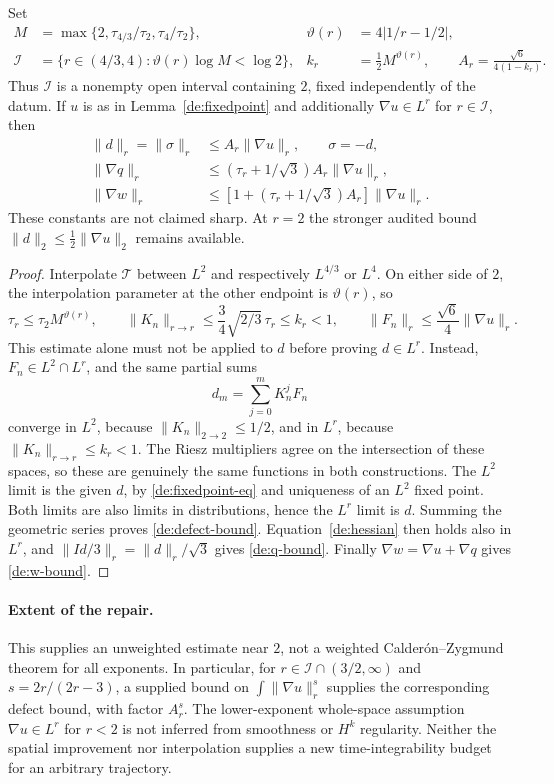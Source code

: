 \begin{theorem}
\label{de:near2}
Set
\begin{align*}
 M&=\max\{2,\tau_{4/3}/\tau_2,\tau_4/\tau_2\},&
 \vartheta(r)&=4|1/r-1/2|,\\
 \mathcal I&=\{r\in(4/3,4):\vartheta(r)\log M<\log2\},&
 k_r&=\tfrac12M^{\vartheta(r)},\qquad
 A_r=\frac{\sqrt6}{4(1-k_r)}.
\end{align*}
Thus $\mathcal I$ is a nonempty open interval containing $2$, fixed
independently of the datum.  If $u$ is as in Lemma~\ref{de:fixedpoint}
and additionally $\nabla u\in L^r$ for $r\in\mathcal I$, then
\begin{align}
 \|d\|_r=\|\sigma\|_r&\le A_r\|\nabla u\|_r,
       \qquad \sigma=-d,\label{de:defect-bound}\\
 \|\nabla q\|_r&\le(\tau_r+1/\sqrt3)A_r\|\nabla u\|_r,\label{de:q-bound}\\
 \|\nabla w\|_r&\le[1+(\tau_r+1/\sqrt3)A_r]\|\nabla u\|_r.
       \label{de:w-bound}
\end{align}
These constants are not claimed sharp.  At $r=2$ the stronger audited
bound $\|d\|_2\le\frac12\|\nabla u\|_2$ remains available.
\end{theorem}
\begin{proof}
Interpolate $\mathcal T$ between $L^2$ and respectively $L^{4/3}$ or
$L^4$.  On either side of $2$, the interpolation parameter at the other
endpoint is $\vartheta(r)$, so
\[
 \tau_r\le\tau_2M^{\vartheta(r)},\qquad
 \|K_n\|_{r\to r}\le\frac34\sqrt{2/3}\,\tau_r\le k_r<1,
 \qquad \|F_n\|_r\le\frac{\sqrt6}{4}\|\nabla u\|_r.
\]
This estimate alone must not be applied to $d$ before proving $d\in L^r$.
Instead, $F_n\in L^2\cap L^r$, and the same partial sums
\[
 d_m=\sum_{j=0}^m K_n^jF_n
\]
converge in $L^2$, because $\|K_n\|_{2\to2}\le1/2$, and in $L^r$,
because $\|K_n\|_{r\to r}\le k_r<1$.  The Riesz multipliers agree on
the intersection of these spaces, so these are genuinely the same
functions in both constructions.  The $L^2$ limit is the given $d$, by
\eqref{de:fixedpoint-eq} and uniqueness of an $L^2$ fixed point.  Both
limits are also limits in distributions, hence the $L^r$ limit is $d$.
Summing the geometric series proves \eqref{de:defect-bound}.
Equation~\eqref{de:hessian} then holds also in $L^r$, and
$\|Id/3\|_r=\|d\|_r/\sqrt3$ gives \eqref{de:q-bound}.
Finally $\nabla w=\nabla u+\nabla q$ gives \eqref{de:w-bound}.
\end{proof}

\paragraph{Extent of the repair.}
This supplies an unweighted estimate near $2$, not a weighted
Calder\'on--Zygmund theorem for all exponents.  In particular, for
$r\in\mathcal I\cap(3/2,\infty)$ and $s=2r/(2r-3)$, a supplied bound
on $\int\|\nabla u\|_r^s$ supplies the corresponding defect bound, with
factor $A_r^s$.  The lower-exponent whole-space assumption
$\nabla u\in L^r$ for $r<2$ is not inferred from smoothness or $H^k$
regularity.  Neither the spatial improvement nor interpolation supplies a
new time-integrability budget for an arbitrary trajectory.

